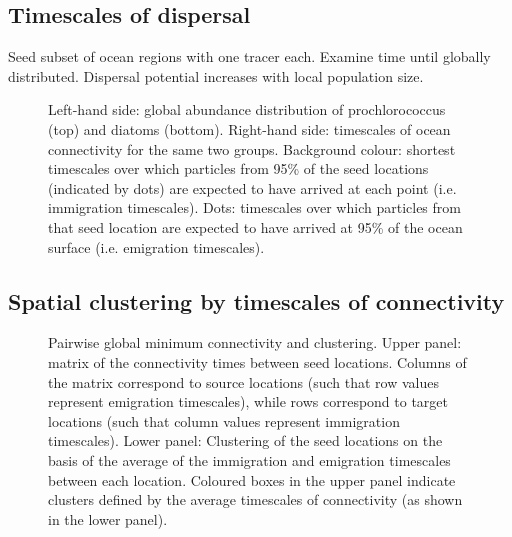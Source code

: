 \documentclass[12pt]{article}
\begin{document}
\subsection{Timescales of dispersal}

Seed subset of ocean regions with one tracer each. Examine time until globally distributed. Dispersal potential increases with local population size.


\begin{figure}[htp!]

\caption{Left-hand side: global abundance distribution of prochlorococcus (top) and diatoms (bottom). Right-hand side: timescales of ocean connectivity for the same two groups. Background colour: shortest timescales over which particles from 95\% of the seed locations (indicated by dots) are expected to have arrived at each point (i.e. immigration timescales). Dots: timescales over which particles from that seed location are expected to have arrived at 95\% of the ocean surface (i.e. emigration timescales).}
\label{connectivity_90_prctile}
\end{figure}



\subsection{Spatial clustering by timescales of connectivity}


\begin{figure}[htp!]

\caption{Pairwise global minimum connectivity and clustering. Upper panel: matrix of the connectivity times between seed locations. Columns of the matrix correspond to source locations (such that row values represent emigration timescales), while rows correspond to target locations (such that column values represent immigration timescales). Lower panel: Clustering of the seed locations on the basis of the average of the immigration and emigration timescales between each location. Coloured boxes in the upper panel indicate clusters defined by the average timescales of connectivity (as shown in the lower panel).}
\label{connectivity_matrices}
\end{figure}
\end{document}
